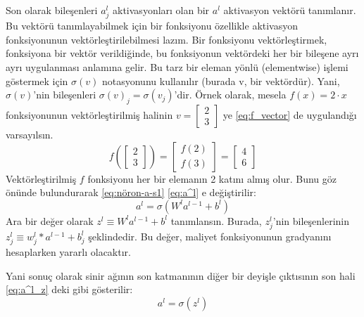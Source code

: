 Son olarak bileşenleri $a^l_j$ aktivasyonları olan bir $a^l$ aktivasyon vektörü tanımlanır. Bu vektörü tanımlayabilmek için bir fonksiyonu özellikle aktivasyon fonksiyonunun vektörleştirilebilmesi lazım. Bir fonksiyonu vektörleştirmek, fonksiyona bir vektör verildiğinde, bu fonksiyonun vektördeki her bir bileşene ayrı ayrı uygulanması anlamına gelir. Bu tarz bir eleman yönlü (elementwise) işlemi göstermek için $\sigma(v)$ notasyonunu kullanılır (burada v, bir vektördür). Yani, $\sigma(v)$'nin bileşenleri $\sigma(v)_j = \sigma(v_j)$'dir.  Örnek olarak, mesela $f(x)=2\cdot x$ fonksiyonunun vektörleştirilmiş halinin $v=\left[ \begin{array}{c} 2 \\ 3 \end{array} \right]$ ye \eqref{eq:f_vector} de uygulandığı varsayılsın.
\begin{equation}
    f\left(\left[ \begin{array}{c} 2 \\ 3 \end{array} \right] \right)
        = \left[ \begin{array}{c} f(2) \\ f(3) \end{array} \right]
        = \left[ \begin{array}{c} 4 \\ 6 \end{array} \right]
        \label{eq:f_vector}
\end{equation}
Vektörleştirilmiş $f$ fonksiyonu her bir elemanın 2 katını almış olur. Bunu göz önünde bulundurarak \eqref{eq:nöron-a-s1} \eqref{eq:a^l} e değiştirilir:
\begin{equation}
    a^{l} = \sigma\left(W^l a^{l-1}+b^l\right)
    \label{eq:a^l}
\end{equation}
Ara bir değer olarak $z^l \equiv W^l a^{l-1} + b^l$ tanımlansın. Burada, $z^l_j$'nin bileşenlerinin $z^l_j \equiv w^l_j * a^{l-1} + b^l_j$ şeklindedir. Bu değer, maliyet fonksiyonunun gradyanını hesaplarken yararlı olacaktır.

Yani sonuç olarak sinir ağının son katmanının diğer bir deyişle çıktısının son hali \eqref{eq:a^l_z} deki gibi gösterilir:
\begin{equation} 
    a^{l} = \sigma(z^l)
    \label{eq:a^l_z}
\end{equation}


